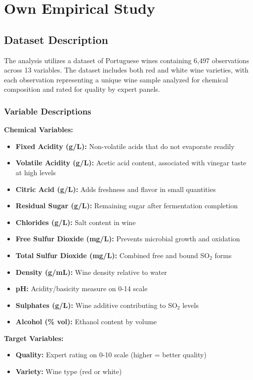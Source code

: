 \chapter{Own Empirical Study}

\section{Dataset Description}

The analysis utilizes a dataset of Portuguese wines containing 6,497 observations across 13 variables. The dataset includes both red and white wine varieties, with each observation representing a unique wine sample analyzed for chemical composition and rated for quality by expert panels.

\subsection{Variable Descriptions}

\textbf{Chemical Variables:}
\begin{itemize}
	\item \textbf{Fixed Acidity (g/L):} Non-volatile acids that do not evaporate readily
	\item \textbf{Volatile Acidity (g/L):} Acetic acid content, associated with vinegar taste at high levels
	\item \textbf{Citric Acid (g/L):} Adds freshness and flavor in small quantities
	\item \textbf{Residual Sugar (g/L):} Remaining sugar after fermentation completion
	\item \textbf{Chlorides (g/L):} Salt content in wine
	\item \textbf{Free Sulfur Dioxide (mg/L):} Prevents microbial growth and oxidation
	\item \textbf{Total Sulfur Dioxide (mg/L):} Combined free and bound SO$_2$ forms
	\item \textbf{Density (g/mL):} Wine density relative to water
	\item \textbf{pH:} Acidity/basicity measure on 0-14 scale
	\item \textbf{Sulphates (g/L):} Wine additive contributing to SO$_2$ levels
	\item \textbf{Alcohol (\% vol):} Ethanol content by volume
\end{itemize}

\textbf{Target Variables:}
\begin{itemize}
	\item \textbf{Quality:} Expert rating on 0-10 scale (higher = better quality)
	\item \textbf{Variety:} Wine type (red or white)
\end{itemize}